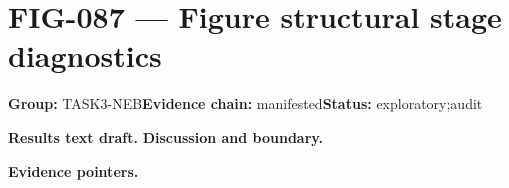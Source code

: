 \clearpage
\section{FIG-087 --- Figure structural stage diagnostics}
\label{figpage:fig-087}
\textbf{Group:} TASK3-NEB\quad \textbf{Evidence chain:} manifested\quad \textbf{Status:} exploratory;audit

\textbf{Results text draft.} 
\textbf{Discussion and boundary.} 


\textbf{Evidence pointers.}



\vfill
